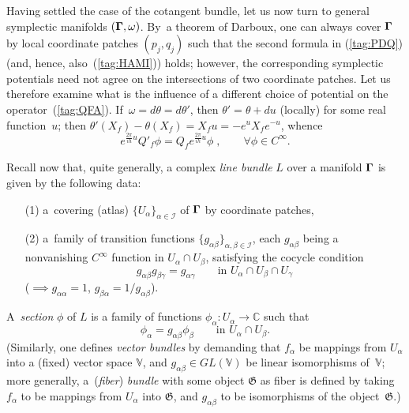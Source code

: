 \documentclass[12pt]{amsart}
\numberwithin{equation}{section}
\theoremstyle{remark}
\let\Bbb\mathbb \let\Cal\mathcal \let\frak\mathfrak
\newcommand\Omg{{\bigam}}   %
\newcommand{\CC}{\C}
\newcommand{\bigam}{\mbox{\boldmath $\Gamma$}}
\newcommand{\C}{\mathbb C}
\begin{document}
Having settled the case of the cotangent bundle, let us now turn to general
symplectic manifolds $(\Omg,\omega)$. By~a theorem of Darboux, one can always
cover $\Omg$ by local coordinate patches $(p_j,q_j)$ such that the second
formula in (\ref{tag:PDQ}) (and, hence, also~(\ref{tag:HAMI})) holds; however,
the corresponding symplectic potentials need not agree on the intersections of
two coordinate patches. Let us therefore examine what is the influence of a
different choice of potential on the operator~(\ref{tag:QFA}).
If~$\omega=d\theta=d\theta'$, then $\theta'=\theta+du$ (locally) for some real
function~$u$; then $\theta'(X_f)- \theta(X_f)=X_f u=-e^u X_f e^{-u}$, whence
\begin{equation}  e^{\frac{2\pi}{ih}u} Q'_f \phi = Q_f e^{\frac{2\pi}{ih}u}
\phi\; , \qquad \forall \phi\in C^\infty. \label{tag:QFB}  \end{equation}

Recall now that, quite generally, a complex {\it line bundle\/} $L$ over a
manifold $\Omg$ is given by the following data:
\begin{enumerate}
\item[(1)] a~covering (atlas) $\{U_\alpha\}_{\alpha\in\Cal I}$ of $\Omg$ by
coordinate patches,
\item[(2)] a~family of transition functions $\{g_{\alpha\beta}\}_{\alpha,\beta
\in\Cal I}$, each $g_{\alpha\beta}$ being a nonvanishing $C^\infty$ function in
$U_\alpha\cap U_\beta$, satisfying the cocycle condition
\begin{equation}  g_{\alpha\beta} g_{\beta\gamma} = g_{\alpha\gamma}
\qquad\text{in } U_\alpha\cap U_\beta\cap U_\gamma  \label{tag:QFC}
\end{equation}
(${}\implies g_{\alpha\alpha}=1$, $g_{\beta\alpha}=1/g_{\alpha\beta}$).
\end{enumerate}
A~{\it section\/} $\phi$ of $L$ is a family of functions $\phi_\alpha:U_\alpha
\to\CC$ such that
\begin{equation}  \phi_\alpha = g_{\alpha\beta} \phi_\beta \qquad
\text{in } U_\alpha\cap U_\beta.   \label{tag:QFD}  \end{equation}
(Similarly, one defines {\it vector bundles\/} by demanding that $f_\alpha$ be
mappings from $U_\alpha$ into a (fixed) vector space $\Bbb V$, and $g_{\alpha
\beta}\in GL(\Bbb V)$ be linear isomorphisms of~$\Bbb V$; more generally,
a~({\it fiber\/}) {\it bundle\/} with some object $\frak G$ as fiber is defined
by taking $f_\alpha$ to be mappings from $U_\alpha$ into $\frak G$, and
$g_{\alpha\beta}$ to be isomorphisms of the object~$\frak G$.)
\end{document}
